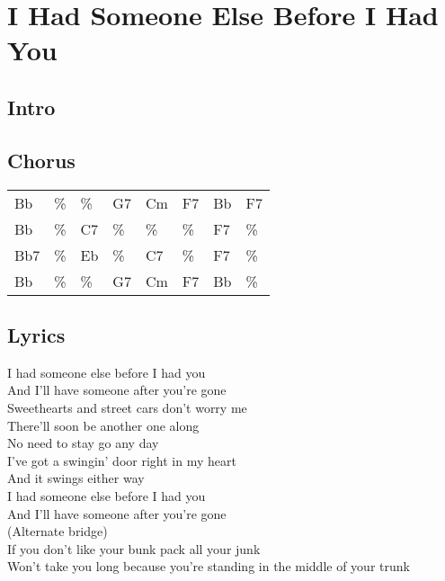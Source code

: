 \section{I Had Someone Else Before I Had You}


\subsection*{Intro}


\subsection*{Chorus}


\begin{tabular}{l l l l l l l l}
Bb & \% & \% & G7 & Cm & F7 & Bb & F7 \\ 
Bb & \% & C7 & \% & \% & \% & F7 & \% \\ 
Bb7 & \% & Eb & \% & C7 & \% & F7 & \% \\ 
Bb & \% & \% & G7 & Cm & F7 & Bb & \% \\ 
\end{tabular}


\subsection*{Lyrics}


I had someone else before I had you \\ 
And I'll have someone after you're gone \\ 
Sweethearts and street cars don't worry me \\ 
There'll soon be another one along \\ 

No need to stay go any day \\ 
I've got a swingin' door right in my heart \\ 
And it swings either way \\ 

I had someone else before I had you \\ 
And I'll have someone after you're gone \\ 

(Alternate bridge) \\ 
If you don't like your bunk pack all your junk \\ 
Won't take you long because you're standing in the middle of your trunk \\ 
